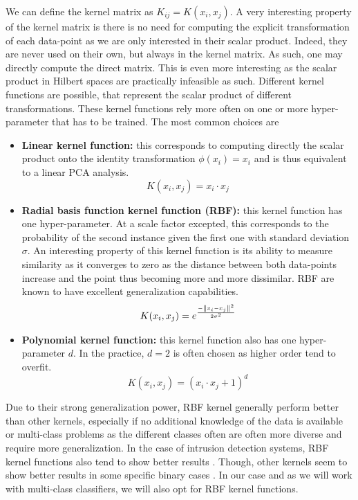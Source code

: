 We can define the kernel matrix as $K_{ij} = K(x_i,x_j)$. A very interesting property of the kernel matrix is there is no need for computing the explicit transformation of each data-point as we are only interested in their scalar product. Indeed, they are never used on their own, but always in the kernel matrix. As such, one may directly compute the direct matrix. This is even more interesting as the scalar product in Hilbert spaces are practically infeasible as such. Different kernel functions are possible, that represent the scalar product of different transformations. These kernel functions rely more often on one or more hyper-parameter that has to be trained. The most common choices are
\begin{itemize}
    \item \textbf{Linear kernel function:} this corresponds to computing directly the scalar product onto the identity transformation $\phi(x_i)=x_i$ and is thus equivalent to a linear PCA analysis.
    \begin{equation}
        K(x_i,x_j) = x_i \cdot x_j
    \end{equation}
    \item \textbf{Radial basis function kernel function (RBF):} this kernel function has one hyper-parameter. At a scale factor excepted, this corresponds to the probability of the second instance given the first one with standard deviation $\sigma$. An interesting property of this kernel function is its ability to measure similarity as it converges to zero as the distance between both data-points increase and the point thus becoming more and more dissimilar. RBF are known to have excellent generalization capabilities.
    \begin{equation}
        K(x_i,x_j) = e^{\frac{-\left\lVert x_i-x_j\right\rVert^2}{2\sigma^2}}
    \end{equation}
    \item \textbf{Polynomial kernel function:} this kernel function also has one hyper-parameter $d$. In the practice, $d=2$ is often chosen as higher order tend to overfit.
    \begin{equation}
        K(x_i,x_j) = (x_i \cdot x_j +1)^d
    \end{equation}
\end{itemize}

Due to their strong generalization power, RBF kernel generally perform better than other kernels, especially if no additional knowledge of the data is available or multi-class problems as the different classes often are often more diverse and require more generalization. In the case of intrusion detection systems, RBF kernel functions also tend to show better results \cite{Kuang2014ADetection}. Though, other kernels seem to show better results in some specific binary cases \cite{Elkhadir2016IntrusionMethods}. In our case and as we will work with multi-class classifiers, we will also opt for RBF kernel functions.

